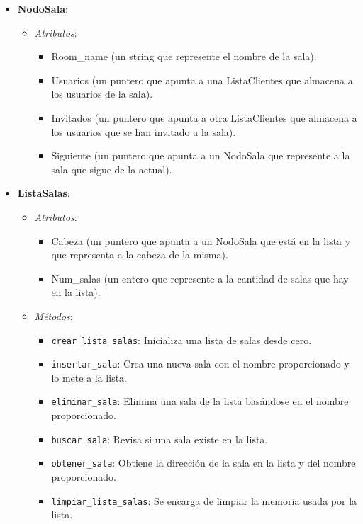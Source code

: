 \documentclass{article}
\begin{document}
\begin{itemize}
    \item \textbf{NodoSala}:
    \begin{itemize}
        \item \textit{Atributos}:
        \begin{itemize}
            \item Room\_name (un string que represente el nombre de la sala).
            \item Usuarios (un puntero que apunta a una ListaClientes que almacena a los usuarios de la sala).
            \item Invitados (un puntero que apunta a otra ListaClientes que almacena a los usuarios que se han invitado a la sala).
            \item Siguiente (un puntero que apunta a un NodoSala que represente a la sala que sigue de la actual).
        \end{itemize}
    \end{itemize}

    \item \textbf{ListaSalas}:
    \begin{itemize}
        \item \textit{Atributos}:
        \begin{itemize}
            \item Cabeza (un puntero que apunta a un NodoSala que está en la lista y que representa a la cabeza de la misma).
            \item Num\_salas (un entero que represente a la cantidad de salas que hay en la lista).
        \end{itemize}
        \item \textit{Métodos}:
        \begin{itemize}
            \item \texttt{crear\_lista\_salas}: Inicializa una lista de salas desde cero.
            \item \texttt{insertar\_sala}: Crea una nueva sala con el nombre proporcionado y lo mete a la lista.
            \item \texttt{eliminar\_sala}: Elimina una sala de la lista basándose en el nombre proporcionado.
            \item \texttt{buscar\_sala}: Revisa si una sala existe en la lista.
            \item \texttt{obtener\_sala}: Obtiene la dirección de la sala en la lista y del nombre proporcionado.
            \item \texttt{limpiar\_lista\_salas}: Se encarga de limpiar la memoria usada por la lista.
        \end{itemize}
    \end{itemize}
\end{itemize}
\end{document}
